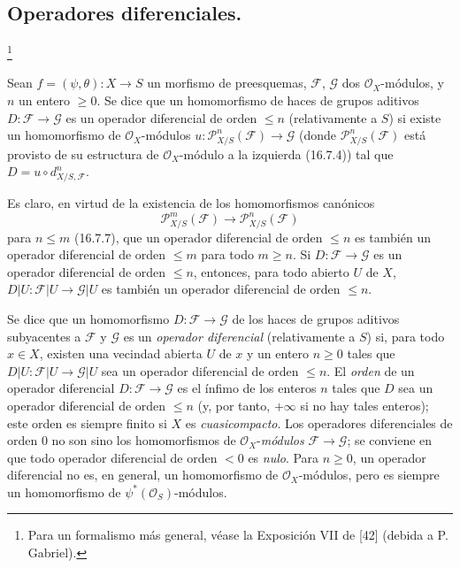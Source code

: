 \subsection{Operadores diferenciales.}
\footnote{Para un formalismo más general, véase la Exposición VII de [42]
(debida a P. Gabriel).}
\label{IV.16.8}

\begin{definition}[16.8.1]
\label{IV.16.8.1}
Sean $f=(\psi,\theta):X\to S$ un morfismo de preesquemas,
$\mathscr{F}$, $\mathscr{G}$ dos $\mathcal{O}_X$-módulos, y $n$ un entero
$\geq0$. Se dice que un homomorfismo de haces de grupos aditivos
$D:\mathscr{F}\to\mathscr{G}$ es un operador diferencial de orden
$\leq n$ (relativamente a $S$) si existe un homomorfismo de
$\mathcal{O}_X$-módulos
$u:\mathscr{P}_{X/S}^n(\mathscr{F})\to\mathscr{G}$ (donde
$\mathscr{P}_{X/S}^n(\mathscr{F})$ está provisto de su estructura de
$\mathcal{O}_X$-módulo a la izquierda \textup{(16.7.4)}) tal que
$D=u\circ d_{X/S,\mathscr{F}}^n$.
\end{definition}

Es claro, en virtud de la existencia de los homomorfismos canónicos
\[
  \mathscr{P}_{X/S}^m(\mathscr{F})
  \longrightarrow\mathscr{P}_{X/S}^n(\mathscr{F})
\]
para $n\leq m$ (16.7.7), que un operador diferencial de orden $\leq n$ es
también un operador diferencial de orden $\leq m$ para todo $m\geq n$. Si
$D:\mathscr{F}\to\mathscr{G}$ es un operador diferencial de orden
$\leq n$, entonces, para todo abierto $U$ de $X$,
$D|U:\mathscr{F}|U\to\mathscr{G}|U$ es también un operador diferencial
de orden $\leq n$.

Se dice que un homomorfismo $D:\mathscr{F}\to\mathscr{G}$ de los haces de
grupos aditivos subyacentes a $\mathscr{F}$ y $\mathscr{G}$ es un
\emph{operador diferencial} (relativamente a $S$) si, para todo $x\in X$,
existen una vecindad abierta $U$ de $x$ y un entero $n\geq0$ tales que
$D|U:\mathscr{F}|U\to\mathscr{G}|U$ sea un operador diferencial de orden
$\leq n$. El \emph{orden} de un operador diferencial
$D:\mathscr{F}\to\mathscr{G}$ es el ínfimo de los enteros $n$ tales que
$D$ sea un operador diferencial de orden $\leq n$ (y, por tanto, $+\infty$
si no hay tales enteros); este orden es siempre finito si $X$ es
\emph{cuasicompacto}. Los operadores diferenciales de orden $0$ no son sino
los homomorfismos de $\mathcal{O}_X$-\emph{módulos}
$\mathscr{F}\to\mathscr{G}$; se conviene en que todo operador diferencial
de orden $<0$ es \emph{nulo}. Para $n\geq0$, un operador diferencial no es,
en general, un homomorfismo de $\mathcal{O}_X$-módulos, pero es siempre
un homomorfismo de $\psi^*(\mathcal{O}_S)$-módulos.

